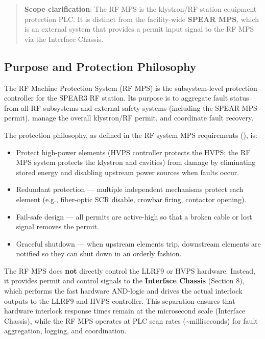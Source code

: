 \begin{quote}
\textbf{Scope clarification}: The RF MPS is the klystron/RF station equipment protection PLC. It is distinct from the facility-wide \textbf{SPEAR MPS}, which is an external system that provides a permit input signal to the RF MPS via the Interface Chassis.
\end{quote}

\subsection{Purpose and Protection Philosophy}\label{purpose-and-protection-philosophy}

The RF Machine Protection System (RF MPS) is the subsystem-level protection controller for the SPEAR3 RF station. Its purpose is to aggregate fault status from all RF subsystems and external safety systems (including the SPEAR MPS permit), manage the overall klystron/RF permit, and coordinate fault recovery.

The protection philosophy, as defined in the RF system MPS requirements (), is:

\begin{itemize}
\tightlist
\item
  Protect high-power elements (HVPS controller protects the HVPS; the RF MPS system protects the klystron and cavities) from damage by eliminating stored energy and disabling upstream power sources when faults occur.
\item
  Redundant protection --- multiple independent mechanisms protect each element (e.g., fiber-optic SCR disable, crowbar firing, contactor opening).
\item
  Fail-safe design --- all permits are active-high so that a broken cable or lost signal removes the permit.
\item
  Graceful shutdown --- when upstream elements trip, downstream elements are notified so they can shut down in an orderly fashion.
\end{itemize}

The RF MPS does \textbf{not} directly control the LLRF9 or HVPS hardware. Instead, it provides permit and control signals to the \textbf{Interface Chassis} (Section 8), which performs the fast hardware AND-logic and drives the actual interlock outputs to the LLRF9 and HVPS controller. This separation ensures that hardware interlock response times remain at the microsecond scale (Interface Chassis), while the RF MPS operates at PLC scan rates (\textasciitilde milliseconds) for fault aggregation, logging, and coordination.

